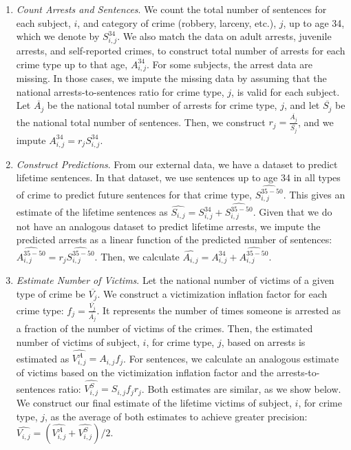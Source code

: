 \begin{enumerate}
\item \textit{Count Arrests and Sentences}. We count the total number of sentences for each subject, $i$, and category of crime (robbery, larceny, etc.), $j$, up to age 34,  which we denote by $S_{i,j}^{34}$. We also match the data on adult arrests, juvenile arrests, and self-reported crimes, to construct total number of  arrests for each crime type up to that age, $A_{i,j}^{34}$. For some subjects, the arrest data are missing. In those cases, we impute the missing data by assuming that the national arrests-to-sentences ratio for crime type, $j$, is valid for each subject. Let $\overline{A_j}$ be the national total number of arrests for crime type, $j$, and let $\overline{S_j}$ be the national total number of sentences. Then, we construct $r_j=\frac{\overline{A_j}}{\overline{S_j}}$, and we impute $A_{i,j}^{34}=r_j S_{i,j}^{34}$.

\item \textit{Construct Predictions}. From our external data, we have a dataset to predict lifetime sentences. In that dataset, we use sentences up to age 34 in all types of crime to predict future sentences for that crime type, $\widehat{S_{i,j}^{35-50}}$. This gives an estimate of the lifetime sentences as $\widehat{S_{i,j}}=S_{i,j}^{34}+\widehat{S_{i,j}^{35-50}}$. Given that we do not have an analogous dataset to predict lifetime arrests, we impute the predicted arrests as a linear function of the predicted number of sentences: $\widehat{A_{i,j}^{35-50}}=r_j \widehat{S_{i,j}^{35-50}}$. Then, we calculate $\widehat{A_{i,j}}=A_{i,j}^{34}+\widehat{A_{i,j}^{35-50}}$.

\item \textit{Estimate Number of Victims}. Let the national number of victims of a given type of crime be $\overline{V_j}$. We construct a victimization inflation factor for each crime type: $f_j=\frac{\overline{V_j}}{\overline{A_j}}$. It represents the number of times someone is arrested as a fraction of the number of victims of the crimes. Then, the estimated number of victims of subject, $i$, for crime type, $j$, based on arrests is estimated as $\widehat{V_{i,j}^{A}}=A_{i,j}f_j$. For sentences, we calculate an analogous estimate of victims based on the victimization inflation factor and the arrests-to-sentences ratio: $\widehat{V_{i,j}^{S}}=S_{i,j}f_j r_j$. Both estimates are similar, as we show below. We construct our final estimate of the lifetime victims of subject, $i$, for crime type, $j$, as the average of both estimates to achieve greater precision: $\widehat{V_{i,j}}=\left(\widehat{V_{i,j}^A}+\widehat{V_{i,j}^S}\right)/2$.


\end{enumerate}
